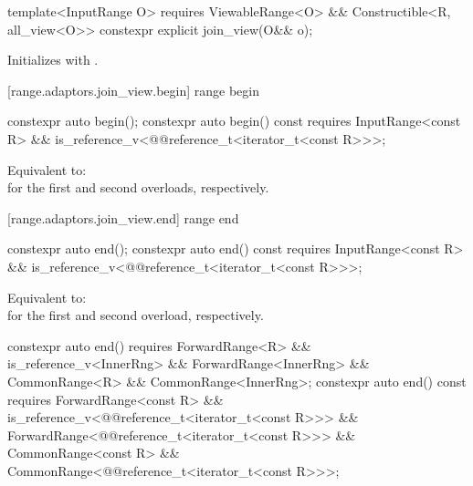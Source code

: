 {%
\begin{itemdecl}
template<InputRange O>
  requires ViewableRange<O> && Constructible<R, all_view<O>>
constexpr explicit join_view(O&& o);
\end{itemdecl}

\begin{itemdescr}
\pnum
\effects Initializes  with .
\end{itemdescr}

[range.adaptors.join_view.begin]{ range begin}

%
\begin{itemdecl}
constexpr auto begin();
constexpr auto begin() const requires InputRange<const R> &&
  is_reference_v<@@reference_t<iterator_t<const R>>>;
\end{itemdecl}

\begin{itemdescr}
\pnum
\effects Equivalent to:
 \\
for the first and second overloads, respectively.
\end{itemdescr}

[range.adaptors.join_view.end]{ range end}

%
\begin{itemdecl}
constexpr auto end();
constexpr auto end() const requires InputRange<const R> &&
  is_reference_v<@@reference_t<iterator_t<const R>>>;
\end{itemdecl}

\begin{itemdescr}
\pnum
\effects Equivalent to:  \\
for the first and second overload, respectively.
\end{itemdescr}

%
\begin{itemdecl}
constexpr auto end() requires ForwardRange<R> &&
  is_reference_v<InnerRng> && ForwardRange<InnerRng> &&
  CommonRange<R> && CommonRange<InnerRng>;
constexpr auto end() const requires ForwardRange<const R> &&
  is_reference_v<@@reference_t<iterator_t<const R>>> &&
  ForwardRange<@@reference_t<iterator_t<const R>>> &&
  CommonRange<const R> && CommonRange<@@reference_t<iterator_t<const R>>>;
\end{itemdecl}

}

